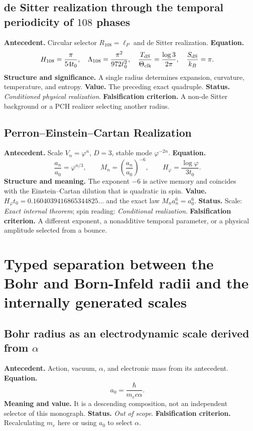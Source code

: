 \subsection*{de Sitter realization through the temporal periodicity of \(108\) phases}
\textbf{Antecedent.} Circular selector \(R_{108}=\ell_P\) and de Sitter
realization. \textbf{Equation.}
\[
H_{108}=\frac{\pi}{54t_0},\quad
\Lambda_{108}=\frac{\pi^2}{972\ell_0^2},\quad
\frac{T_{\rm dS}}{\Theta_{\rm clk}}=\frac{\log3}{2\pi},\quad
\frac{S_{\rm dS}}{k_B}=\pi.
\]
\textbf{Structure and significance.} A single radius determines expansion,
curvature, temperature, and entropy. \textbf{Value.} The preceding exact
quadruple. \textbf{Status.} \emph{Conditioned physical realization}.
\textbf{Falsification criterion.} A non-de Sitter background or a PCH realizer selecting another
radius.

\subsection*{Perron--Einstein--Cartan Realization }
\textbf{Antecedent.} Scale \(V_n=\varphi^n\), \(D=3\), stable mode
\(\varphi^{-2n}\). \textbf{Equation.}
\[
\frac{a_n}{a_0}=\varphi^{n/3},\qquad
M_n=\left(\frac{a_n}{a_0}\right)^{-6},\qquad
H_\varphi=\frac{\log\varphi}{3t_0}.
\]
\textbf{Structure and meaning.} The exponent \(-6\) is active memory and coincides with the Einstein--Cartan dilution that is quadratic in spin. \textbf{Value.} \(H_\varphi t_0=0.1604039416865344825\ldots\) and the exact law \(M_na_n^6=a_0^6\). \textbf{Status.} Scale: \emph{Exact internal theorem}; spin reading: \emph{Conditional realization}. \textbf{Falsification criterion.} A different exponent, a nonadditive temporal parameter, or a physical amplitude selected from a bounce.

\section{Typed separation between the Bohr and Born-Infeld radii and the internally generated scales}

\subsection*{Bohr radius as an electrodynamic scale derived from \(\alpha\)}
\textbf{Antecedent.} Action, vacuum, \(\alpha\), and electronic mass from its
antecedent. \textbf{Equation.}
\begin{equation}
a_0=\frac{\hbar}{m_ec\alpha}.
\label{eq:atlas-bohr}
\end{equation}
\textbf{Meaning and value.} It is a descending composition,
not an independent selector of this monograph.
\textbf{Status.} \emph{Out of scope}. \textbf{Falsification criterion.} Recalculating
\(m_e\) here or using \(a_0\) to select \(\alpha\).

